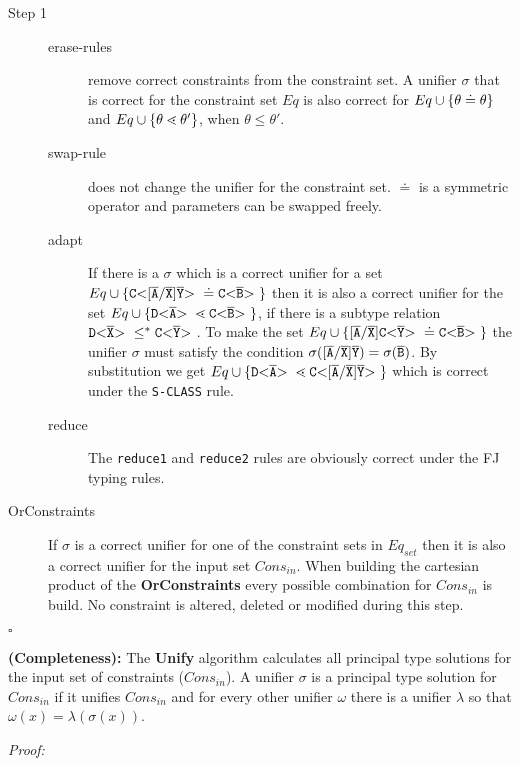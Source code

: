 \documentclass[runningheads]{llncs}
\begin{document}
\begin{description}
\item[Step 1]
\begin{description}
\item[erase-rules] remove correct constraints from the constraint set.
A unifier $\sigma$ that is correct for the constraint set $Eq$
is also correct for $Eq \cup \{ \theta \doteq \theta \}$
and $Eq \cup \{ \theta \lessdot \theta' \}$, when $\theta \leq \theta'$.
\item[swap-rule] does not change the unifier for the constraint set.
$\doteq$ is a symmetric operator and parameters can be swapped freely.
\item[adapt] If there is a $\sigma$ which is a correct unifier for a set
$Eq \cup \{  \mathtt{C {\tt <} [\overline{\tt A}/\overline{\tt X}]\overline{\tt Y} {\tt >} \ } \doteq \mathtt{C {\tt <} \overline{\tt B} {\tt >} \ } \}$ then it is also
a correct unifier for the set $Eq \cup \{  \mathtt{D {\tt <} \overline{\tt A} {\tt >} \ } \lessdot \mathtt{C {\tt <} \overline{\tt B} {\tt >} \ } \}$,
if there is a subtype relation $\mathtt{D {\tt <} \overline{\tt X} {\tt >} \ } \leq^* \mathtt{C {\tt <} \overline{\tt Y} {\tt >} \ }$.
To make the set $Eq \cup \{  [\overline{\tt A}/\overline{\tt X}]\mathtt{C {\tt <} \overline{\tt Y} {\tt >} \ } \doteq \mathtt{C {\tt <} \overline{\tt B} {\tt >} \ } \}$ the unifier 
$\sigma$ must satisfy the condition $\sigma([\overline{\tt A}/\overline{\tt X}]\overline{\tt Y}) = \sigma(\overline{\tt B})$.
By substitution we get $Eq \cup \{  \mathtt{D {\tt <} \overline{\tt A} {\tt >} \ } \lessdot \mathtt{C {\tt <} [\overline{\tt A}/\overline{\tt X}]\overline{\tt Y} {\tt >} \ } \}$
which is correct under the \texttt{S-CLASS} rule.
\item[reduce] The \texttt{reduce1} and \texttt{reduce2} rules are obviously correct under the FJ typing rules.
\end{description}

\item[OrConstraints]
If $\sigma$ is a correct unifier for one of the constraint sets in $Eq_{set}$
then it is also a correct unifier for the input set $Cons_{in}$.
When building the cartesian product of the \textbf{OrConstraints} every possible
combination for $Cons_{in}$ is build.
No constraint is altered, deleted or modified during this step.
\end{description}
\hfill $\square$


\begin{theoremAndi}\label{theo:unifyCompleteness}
  \textbf{(Completeness):} The \textbf{Unify} algorithm calculates all principal type solutions for the input set of constraints ($Cons_{in}$).
  A unifier $\sigma$ is a principal type solution for $Cons_{in}$ if it unifies $Cons_{in}$
  and for every other unifier $\omega$ there is a unifier $\lambda$ so that $\omega(x) = \lambda(\sigma(x))$.
\end{theoremAndi}
\textit{Proof:}
\end{document}

